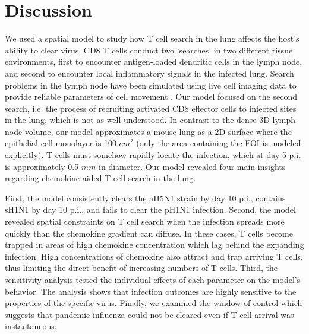 \documentclass[preprint,10pt,numbers]{elsarticle}
\begin{document}
\section*{Discussion}

We used a spatial model to study how T cell search in the lung affects the host's ability to clear virus.  CD8 T cells conduct two `searches' in two different tissue environments, first to encounter antigen-loaded dendritic cells in the lymph node, and second to encounter local inflammatory signals in the infected lung.  Search problems in the lymph node have been simulated using live cell imaging data to provide reliable parameters of cell movement \citep{Mirsky2011, Vroomans2012}.  Our model focused on the second search, i.e. the process of recruiting activated CD8 effector cells to infected sites in the lung, which is not as well understood.  In contrast to the dense 3D lymph node volume, our model approximates a mouse lung as a 2D surface where the epithelial cell monolayer is 100 $cm^2$ (only the area containing the FOI is modeled explicitly).  T cells must somehow rapidly locate the infection, which at day 5 p.i. is approximately 0.5 $mm$ in diameter.  Our model revealed four main insights regarding chemokine aided T cell search in the lung.

First, %
the model consistently clears the aH5N1 strain by day 10 p.i., contains sH1N1 by day 10 p.i., and fails to clear the pH1N1 infection.  Second, the model revealed spatial constraints on T cell search when the infection spreads more quickly than the chemokine gradient can diffuse.  In these cases, T cells become trapped in areas of high chemokine concentration which lag behind the expanding infection.  High concentrations of chemokine also attract and trap arriving T cells, thus limiting the direct benefit of increasing numbers of T cells. Third, the sensitivity analysis tested the individual effects of each parameter on the model's behavior.  The analysis shows that infection outcomes are highly sensitive to the properties of the specific virus.
Finally, we examined the window of control which suggests that pandemic influenza could not be cleared even if T cell arrival was instantaneous.  


\end{document}
